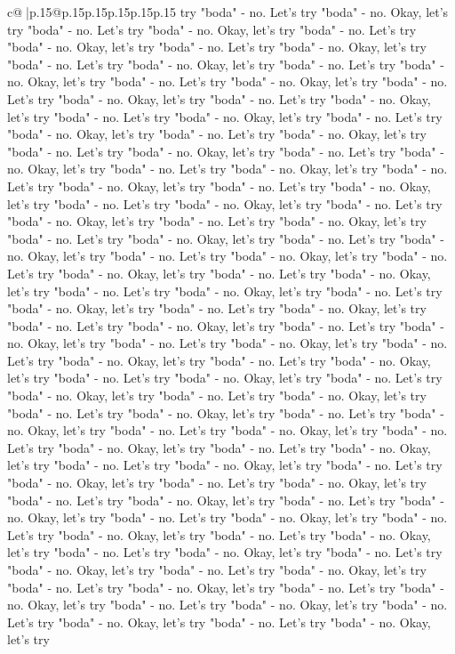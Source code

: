 \documentclass{article}
\begin{document}
{\begin{supertabular}{c@{$\;$}|p{.15\linewidth}@{}p{.15\linewidth}p{.15\linewidth}p{.15\linewidth}p{.15\linewidth}p{.15\linewidth}}
{{{try "boda" {-} no. Let's try "boda" {-} no. Okay, let's try "boda" {-} no. Let's try "boda" {-} no. Okay, let's try "boda" {-} no. Let's try "boda" {-} no. Okay, let's try "boda" {-} no. Let's try "boda" {-} no. Okay, let's try "boda" {-} no. Let's try "boda" {-} no. Okay, let's try "boda" {-} no. Let's try "boda" {-} no. Okay, let's try "boda" {-} no. Let's try "boda" {-} no. Okay, let's try "boda" {-} no. Let's try "boda" {-} no. Okay, let's try "boda" {-} no. Let's try "boda" {-} no. Okay, let's try "boda" {-} no. Let's try "boda" {-} no. Okay, let's try "boda" {-} no. Let's try "boda" {-} no. Okay, let's try "boda" {-} no. Let's try "boda" {-} no. Okay, let's try "boda" {-} no. Let's try "boda" {-} no. Okay, let's try "boda" {-} no. Let's try "boda" {-} no. Okay, let's try "boda" {-} no. Let's try "boda" {-} no. Okay, let's try "boda" {-} no. Let's try "boda" {-} no. Okay, let's try "boda" {-} no. Let's try "boda" {-} no. Okay, let's try "boda" {-} no. Let's try "boda" {-} no. Okay, let's try "boda" {-} no. Let's try "boda" {-} no. Okay, let's try "boda" {-} no. Let's try "boda" {-} no. Okay, let's try "boda" {-} no. Let's try "boda" {-} no. Okay, let's try "boda" {-} no. Let's try "boda" {-} no. Okay, let's try "boda" {-} no. Let's try "boda" {-} no. Okay, let's try "boda" {-} no. Let's try "boda" {-} no. Okay, let's try "boda" {-} no. Let's try "boda" {-} no. Okay, let's try "boda" {-} no. Let's try "boda" {-} no. Okay, let's try "boda" {-} no. Let's try "boda" {-} no. Okay, let's try "boda" {-} no. Let's try "boda" {-} no. Okay, let's try "boda" {-} no. Let's try "boda" {-} no. Okay, let's try "boda" {-} no. Let's try "boda" {-} no. Okay, let's try "boda" {-} no. Let's try "boda" {-} no. Okay, let's try "boda" {-} no. Let's try "boda" {-} no. Okay, let's try "boda" {-} no. Let's try "boda" {-} no. Okay, let's try "boda" {-} no. Let's try "boda" {-} no. Okay, let's try "boda" {-} no. Let's try "boda" {-} no. Okay, let's try "boda" {-} no. Let's try "boda" {-} no. Okay, let's try "boda" {-} no. Let's try "boda" {-} no. Okay, let's try "boda" {-} no. Let's try "boda" {-} no. Okay, let's try "boda" {-} no. Let's try "boda" {-} no. Okay, let's try "boda" {-} no. Let's try "boda" {-} no. Okay, let's try "boda" {-} no. Let's try "boda" {-} no. Okay, let's try "boda" {-} no. Let's try "boda" {-} no. Okay, let's try "boda" {-} no. Let's try "boda" {-} no. Okay, let's try "boda" {-} no. Let's try "boda" {-} no. Okay, let's try "boda" {-} no. Let's try "boda" {-} no. Okay, let's try "boda" {-} no. Let's try "boda" {-} no. Okay, let's try "boda" {-} no. Let's try "boda" {-} no. Okay, let's try "boda" {-} no. Let's try "boda" {-} no. Okay, let's try "boda" {-} no. Let's try "boda" {-} no. Okay, let's try "boda" {-} no. Let's try "boda" {-} no. Okay, let's try "boda" {-} no. Let's try "boda" {-} no. Okay, let's try "boda" {-} no. Let's try "boda" {-} no. Okay, let's try "boda" {-} no. Let's try "boda" {-} no. Okay, let's try "boda" {-} no. Let's try "boda" {-} no. Okay, let's try "boda" {-} no. Let's try "boda" {-} no. Okay, let's try "boda" {-} no. Let's try "boda" {-} no. Okay, let's try "boda" {-} no. Let's try "boda" {-} no. Okay, let's try }}}
\end{supertabular}}
\end{document}
